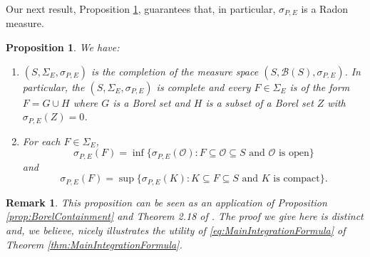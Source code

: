 \documentclass[11pt]{article}
\newtheorem{proposition}[theorem]{Proposition}
\newtheorem{remark}{Remark}
\begin{document}
\noindent Our next result, Proposition \ref{prop:Regular}, guarantees that, in particular, $\sigma_{P,E}$ is a Radon measure. 

\begin{proposition}\label{prop:Regular}
We have:
\begin{enumerate}
    \item\label{item:Complete} $(S,\Sigma_E,\sigma_{P,E})$ is the completion of the measure space $(S,\mathcal{B}(S),\sigma_{P,E})$. In particular, the $(S,\Sigma_E,\sigma_{P,E})$ is complete and every $F\in \Sigma_E$ is of the form $F=G\cup H$ where $G$ is a Borel set and $H$ is a subset of a Borel set $Z$ with $\sigma_{P,E}(Z)=0$.
\item\label{item:Regular} For each $F\in\Sigma_E$,
\begin{equation}\label{eq:OuterRegular}
\sigma_{P,E}(F)=\inf\{\sigma_{P,E}(\mathcal{O}):F\subseteq\mathcal{O}\subseteq S\mbox{ and $\mathcal{O}$ is open}\}
\end{equation}
and
\begin{equation}
\sigma_{P,E}(F)=\sup\{\sigma_{P,E}(K):K\subseteq F\subseteq S\mbox{ and $K$ is compact}\}.
\end{equation}
\end{enumerate} 
\end{proposition}
\begin{remark}
This proposition can be seen as an application of Proposition \ref{prop:BorelContainment} and Theorem 2.18 of \cite{Rudin1987}. The proof we give here is distinct and, we believe, nicely illustrates the utility of \eqref{eq:MainIntegrationFormula} of Theorem \ref{thm:MainIntegrationFormula}.
\end{remark}
\end{document}
